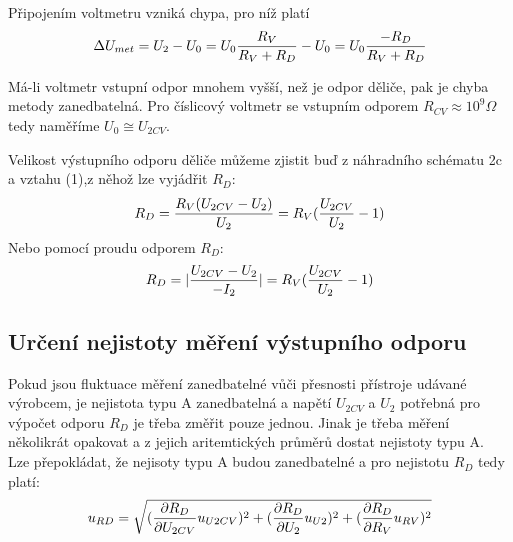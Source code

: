 \documentclass[5pt]{article}
\begin{document}
Připojením voltmetru vzniká chypa, pro níž platí
\begin{equation}
\Delta U_{met}=U_2-U_0=U_0{R_V \over R_V+R_D} - U_0 = U_0 {-R_D \over R_V + R_D }
\end{equation}

Má-li voltmetr vstupní odpor mnohem vyšší, než je odpor děliče, pak je chyba metody zanedbatelná. Pro číslicový voltmetr se vstupním odporem $R_{CV}  \approx  10^9 \Omega$ tedy naměříme $U_0 \cong U_{2CV}$.

Velikost výstupního odporu děliče můžeme zjistit buď z náhradního schématu 2c a vztahu (1),z něhož lze vyjádřit $R_D$:
\begin{equation}
R_D={R_V(U_{2CV}-U_2) \over U_2} = R_V({U_{2CV} \over U_2}-1)
\end{equation}
Nebo pomocí proudu odporem $R_D$:
\begin{equation}
R_D=|{U_{2CV}-U_2 \over -I_2}| = R_V({U_{2CV} \over U_2}-1)
\end{equation}
\subsection{Určení nejistoty měření výstupního odporu}

Pokud jsou fluktuace měření zanedbatelné vůči přesnosti přístroje udávané výrobcem, je nejistota typu A zanedbatelná a napětí $U_{2CV}$ a $U_2$ potřebná pro výpočet odporu $R_D$ je třeba změřit pouze jednou. Jinak je třeba měření několikrát opakovat a z jejich aritemtických průměrů dostat nejistoty typu A.\\
Lze přepokládat, že nejisoty typu A budou zanedbatelné a pro nejistotu $R_D$ tedy platí:
\begin{equation}
u_{RD}=\sqrt{({\partial R_D \over \partial U_{2CV}}u_{U2CV})^2+({\partial R_D \over \partial U_{2}}u_{U2})^2+({\partial R_D \over \partial R_{V}}u_{RV})^2}
\end{equation}
\end{document}
